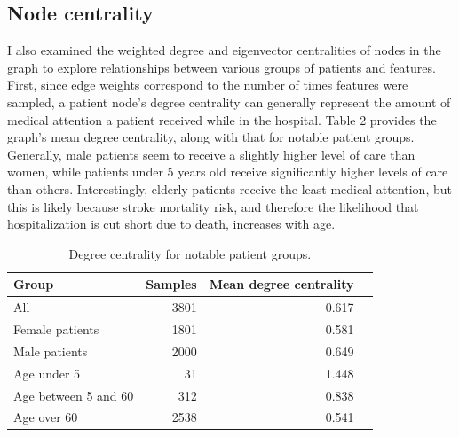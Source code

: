 \documentclass{article}
\begin{document}
\subsection{Node centrality}
I also examined the weighted degree and eigenvector centralities of nodes in the graph to explore relationships between various groups of patients and features. First, since edge weights correspond to the number of times features were sampled, a patient node's degree centrality can generally represent the amount of medical attention a patient received while in the hospital. Table 2 provides the graph's mean degree centrality, along with that for notable patient groups. Generally, male patients seem to receive a slightly higher level of care than women, while patients under 5 years old receive significantly higher levels of care than others. Interestingly, elderly patients receive the least medical attention, but this is likely because stroke mortality risk, and therefore the likelihood that hospitalization is cut short due to death, increases with age.

\begin{table}
    \caption{
      Degree centrality for notable patient groups.
    }
    \label{tab:exp}
    \centering
    \centering
    \label{tab:exp-synth}
    \begin{small}
    \begin{sc}
    \begin{tabular}{lrrr}
    \toprule
    Group                       & Samples &  Mean degree centrality \\
    \midrule
    All                         & 3801 & 0.617 \\
    Female patients                         & 1801 & 0.581 \\
    Male patients                         & 2000 & 0.649     \\
    Age under 5                            & 31 & 1.448    \\ 
    Age between 5 and 60                    & 312 & 0.838 \\
    Age over 60                                  & 2538 & 0.541 \\
    \bottomrule
    \end{tabular}
    \end{sc}
    \end{small}
    \vskip -0.1in
\end{table}
\end{document}
